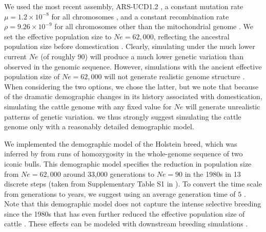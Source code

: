 \documentclass{article}
\begin{document}
We used the most recent assembly, ARS-UCD1.2
\citep{Rosen2020}, a constant mutation rate \(\mu=1.2\times 10^{-8}\) for all chromosomes \citep{Harland2017}, and a constant recombination rate \(\rho=9.26 \times 10^{-9}\) for all chromosomes other than the mitochondrial genome \citep{Ma2015}.
%
We set the effective population size to $Ne=62,000$, reflecting the ancestral population size before  domestication  \citep{MacLeod2013}.
%
%
Clearly, simulating under the much lower current $Ne$ (of roughly 90) will produce a much lower genetic variation than observed in the genomic sequence.
%
However, simulations with the ancient effective population size of $Ne=62,000$ will not generate realistic genome structure  \citep[e.g.,][]{Rosen2020}.
%
When considering the two options, we chose the latter, but we note that because of the dramatic demographic changes in its history associated with domestication, simulating the cattle genome with any fixed value for $Ne$ will generate unrealistic patterns of genetic variation.
%
we thus strongly suggest simulating the cattle genome only with a reasonably detailed demographic model.

We implemented the demographic model of the Holstein breed, which was
inferred by \cite{MacLeod2013} from runs of homozygosity in the whole-genome sequence of two iconic bulls. 
%
This demographic model specifies the reduction in population size from $Ne=62,000$  around 33,000 generations to $Ne=90$ in the 1980s in 13 discrete steps (taken from Supplementary Table S1 in \cite{MacLeod2013}). 
%
To convert the time scale from generations to years, we suggest using an average generation time of $5$ \citep{MacLeod2013}.
%
Note that this demographic model does not capture the intense selective breeding since the 1980s that has even further reduced the effective population size of cattle \citep{MacLeod2014, Gaynor2020, Obsteter2021}. These effects can be modeled with
downstream breeding simulations \citep[e.g.,][]{Gaynor2020}.
%
\end{document}
